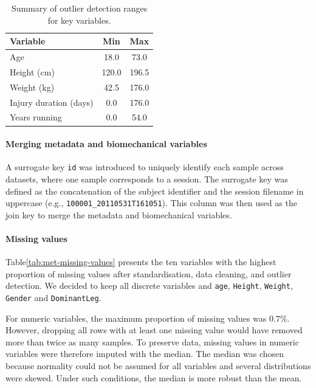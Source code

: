 \begin{table}[htbp]
    \centering
    \caption[Outlier detection range for tabular data]{Summary of outlier detection ranges for key variables.\label{tab:met-outlier-range}}
    \begin{tabular}{lcc}
        \hline
        \textbf{Variable} & \textbf{Min} & \textbf{Max} \\
        \hline
        Age & 18.0 & 73.0 \\
        Height (cm) & 120.0 & 196.5 \\
        Weight (kg) & 42.5 & 176.0 \\
        Injury duration (days) & 0.0 & 176.0 \\
        Years running & 0.0 & 54.0 \\
        \hline
    \end{tabular}
\end{table}


\paragraph{Merging metadata and biomechanical variables} 
A surrogate key \texttt{id} was introduced to uniquely identify each sample across datasets, where one sample corresponds to a session. The surrogate key was defined as the concatenation of the subject identifier and the session filename in uppercase (e.g., \texttt{100001\_20110531T161051}). This column was then used as the join key to merge the metadata and biomechanical variables.

\paragraph{Missing values}
Table\ref{tab:met-missing-values} presents the ten variables with the highest proportion of missing values after standardisation, data cleaning, and outlier detection. We decided to keep all discrete variables and \texttt{age}, \texttt{Height}, \texttt{Weight}, \texttt{Gender} and \texttt{DominantLeg}.

For numeric variables, the maximum proportion of missing values was 0.7\%. However, dropping all rows with at least one missing value would have removed more than twice as many samples. To preserve data, missing values in numeric variables were therefore imputed with the median. The median was chosen because normality could not be assumed for all variables and several distributions were skewed. Under such conditions, the median is more robust than the mean.

